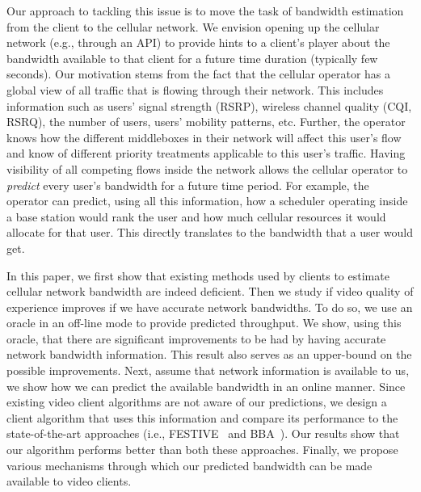 Our approach to tackling this issue is to move the task of bandwidth
estimation from the client to the cellular network. We envision
opening up the cellular network (e.g., through an API) to provide
hints to a client's player about the bandwidth available to that
client for a future time duration (typically few seconds). Our
motivation stems from the fact that the cellular operator has a global
view of all traffic that is flowing through their network. This
includes information such as users' signal strength (RSRP), wireless
channel quality (CQI, RSRQ), the number of users, users' mobility
patterns, etc. Further, the operator knows how the different
middleboxes in their network will affect this user's flow and know of
different priority treatments applicable to this user's
traffic. Having visibility of all competing flows inside the network
allows the cellular operator to {\em predict} every user's bandwidth
for a future time period. For example, the operator can predict, using
all this information, how a scheduler operating inside a base station
would rank the user and how much cellular resources it would allocate
for that user. This directly translates to the bandwidth that a user
would get.

In this paper, we first show that existing methods used by clients to
estimate cellular network bandwidth are indeed deficient. Then we
study if video quality of experience improves if we have accurate
network bandwidths. To do so, we use an oracle in an off-line mode to
provide predicted throughput. We show, using this oracle, that there
are significant improvements to be had by having accurate network
bandwidth information. This result also serves as an upper-bound on
the possible improvements. Next, assume that network information is
available to us, we show how we can predict the available bandwidth in
an online manner. Since existing video client algorithms are not aware
of our predictions, we design a client algorithm that uses this
information and compare its performance to the state-of-the-art
approaches (i.e., FESTIVE~\cite{Festive} and BBA~\cite{BBA}). Our
results show that our algorithm performs better than both these
approaches. Finally, we propose various mechanisms through which our
predicted bandwidth can be made available to video clients.

